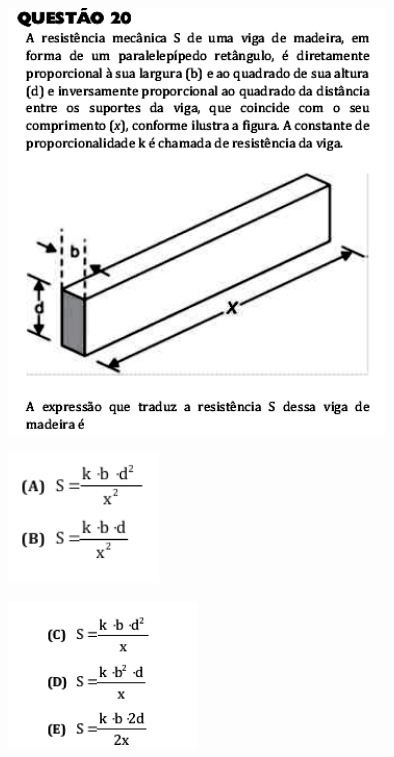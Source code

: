 \documentclass[a4paper]{article}
\begin{document}
\begin{figure}[H]
	\begin{center}
		\includegraphics[width=10cm]{L2Q20_1.png}
	\end{center}
\end{figure}
\begin{figure}[H]
	\begin{center}
		\includegraphics[width=4cm]{L2Q20_3.png}
	\end{center}
\end{figure}
\begin{figure}[H]
	\begin{center}
		\includegraphics[width=5cm]{L2Q20_2.png}
	\end{center}
\end{figure}
\end{document}
